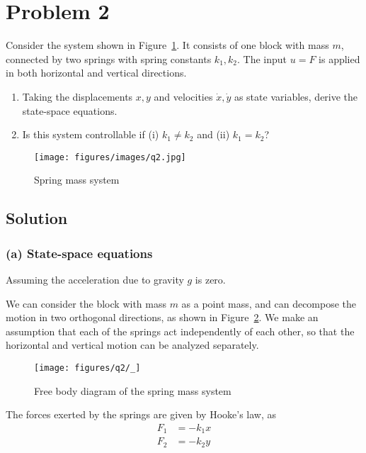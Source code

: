 \section*{Problem 2}

Consider the system shown in Figure~\ref{fig:q2}.
It consists of one block with mass \( m \), connected by two springs with spring constants \( k_{1}, k_{2} \).
The input \( u=F \) is applied in both horizontal and vertical directions.
\begin{enumerate}[label= (\alph*), topsep=3pt, itemsep=-0.2em]
    \item Taking the displacements \( x, y \) and velocities \( \dot{x}, \dot{y} \) as state variables, derive the state-space equations.
    \item Is this system controllable if (i) \( k_{1} \neq k_{2} \) and (ii) \( k_{1}=k_{2} \)?
\end{enumerate}
\begin{figure}[h]
    \centering
    \texttt{[image: figures/images/q2.jpg]}
    \caption{
        Spring mass system
    }\label{fig:q2}
\end{figure}
\vspace*{-2.5em}

\subsection*{Solution}

\subsubsection*{(a) State-space equations}

Assuming the acceleration due to gravity \( g \) is zero.

We can consider the block with mass \( m \) as a point mass, and can decompose the motion in two orthogonal directions, as shown in Figure~\ref{fig:q2-decomposition}.
We make an assumption that each of the springs act independently of each other, so that the horizontal and vertical motion can be analyzed separately.

\begin{figure}[h]
    \centering
    \texttt{[image: figures/q2/\_]}
    \caption{
        Free body diagram of the spring mass system
    }\label{fig:q2-decomposition}
\end{figure}

The forces exerted by the springs are given by Hooke's law, as
\begin{align*}
    F_{1}
     & = -k_{1}x
    \\
    F_{2}
     & = -k_{2}y
\end{align*}


